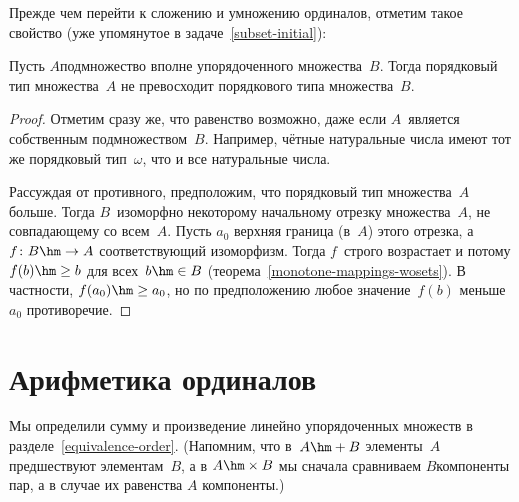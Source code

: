 Прежде чем перейти к сложению и умножению ординалов,
отметим такое свойство (уже упомянутое в задаче~\ref{subset-initial}):

\begin{theorem}
        \label{subset-less-or-equal}
Пусть $A$\т подмножество вполне упорядоченного множества~$B$.
Тогда порядковый тип множества~$A$ не превосходит
порядкового
типа множества~$B$.
\end{theorem}

\begin{proof}
Отметим сразу же, что равенство возможно, даже если $A$~является
собственным подмножеством~$B$. Например, чётные натуральные
числа имеют тот же порядковый тип~$\omega$, что и все
натуральные числа.

Рассуждая от противного, предположим, что порядковый тип
множества~$A$ больше. Тогда $B$~изоморфно некоторому начальному
отрезку множества~$A$, не совпадающему со всем~$A$. Пусть $a_0$\т
верхняя граница (в~$A$) этого отрезка, а $f\colon B \hm\to A$\т
соответствующий изоморфизм. Тогда $f$~строго возрастает и
потому $f(b)\hm\ge b$ для всех~$b\hm\in B$
(теорема~\ref{monotone-mappings-wosets}). В частности, $f(a_0)\hm\ge a_0$,
но по предположению любое значение~$f(b)$ меньше~$a_0$\т
противоречие.
\end{proof}

\section{Арифметика ординалов}
        \label{ordinal-arithmetics}

Мы определили сумму
и произведение
линейно упорядоченных
множеств в разделе~\ref{equivalence-order}. (Напомним, что
в~$A\hm+B$ элементы~$A$ предшествуют элементам~$B$, а в $A\hm\times B$
мы сначала сравниваем $B$\д компоненты пар, а в случае их равенства\т
$A$\д
компоненты.)


